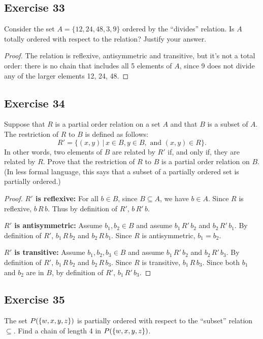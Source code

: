 \documentclass[14pt]{extarticle}
\let\mathscr\relax
\newcommand{\ps}{\mathscr{P}} %
\begin{document}
\subsection{Exercise 33}
Consider the set \(A = \{12, 24, 48, 3, 9\}\) ordered by the “divides” relation. Is $A$ totally ordered with respect 
to the relation? Justify your answer.

\begin{proof}
The relation is reflexive, antisymmetric and transitive, but it's not a total order: there is no chain that includes 
all 5 elements of $A$, since 9 does not divide any of the larger elements 12, 24, 48.
\end{proof}

\subsection{Exercise 34}
Suppose that $R$ is a partial order relation on a set $A$ and that $B$ is a subset of $A$. The restriction of $R$ to 
$B$ is defined as follows: 
\[
R' = \{(x,y)\,|\,x\in B, y \in B, \text{ and } (x, y) \in R\}.
\] 
In other words, two elements of $B$ are related by $R'$ if, and only if, they are related by $R$. Prove that the 
restriction of $R$ to $B$ is a partial order relation on $B$. (In less formal language, this says that a subset of a 
partially ordered set is partially ordered.)

\begin{proof}
{\bf $R'$ is reflexive:} For all \(b \in B\), since \(B \subseteq A\), we have \(b \in A\). Since $R$ is reflexive, 
\(b \,R\, b\). Thus by definition of $R'$, \(b \,R'\, b\).

{\bf $R'$ is antisymmetric:} Assume \(b_1, b_2 \in B\) and assume \(b_1 \,R'\, b_2\) and \(b_2 \,R'\, b_1\). By 
definition of $R'$, \(b_1 \,R\, b_2\) and \(b_2 \,R\, b_1\). Since $R$ is antisymmetric, \(b_1 = b_2\).

{\bf $R'$ is transitive:} Assume \(b_1, b_2, b_3 \in B\) and assume \(b_1 \,R'\, b_2\) and \(b_2 \,R'\, b_3\). By
definition of $R'$, \(b_1 \,R\, b_2\) and \(b_2 \,R\, b_3\). Since $R$ is transitive, \(b_1 \,R\, b_3\). Since
both \(b_1\) and \(b_2\) are in $B$, by definition of $R'$, \(b_1 \,R'\, b_3\).
\end{proof}

\subsection{Exercise 35}
The set \(\ps(\{w, x, y, z\})\) is partially ordered with respect to the “subset” relation \(\subseteq\). Find a 
chain of length 4 in \(\ps(\{w, x, y, z\})\).
\end{document}
